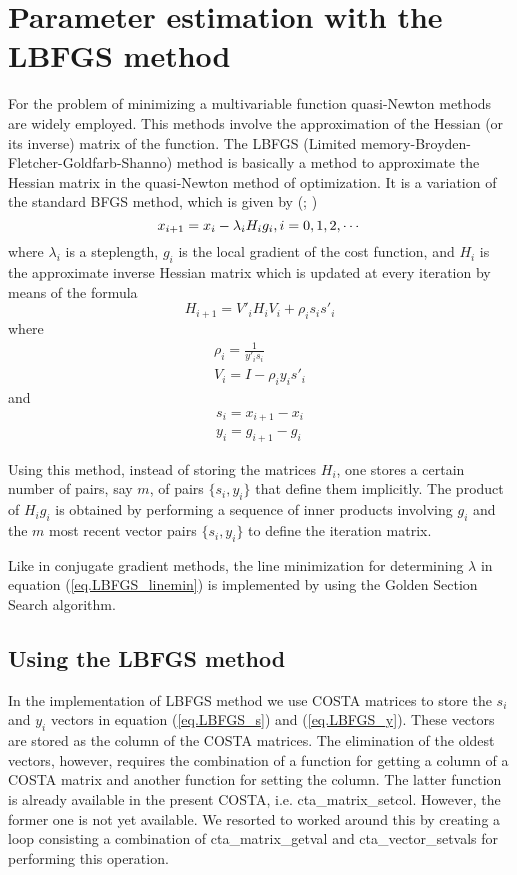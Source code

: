 \section{Parameter estimation with the LBFGS method}
For the problem of minimizing a multivariable function quasi-Newton methods
are widely employed. This methods involve the approximation of the Hessian
(or its inverse) matrix of the function. The LBFGS (Limited
memory-Broyden-Fletcher-Goldfarb-Shanno) method is basically a method to
approximate the Hessian matrix in the quasi-Newton method of optimization.
It is a variation of the standard BFGS method, which is given by (\cite{Nocedal1980}; \cite{Byrdetall1994})
\begin{equation}
  \label{eq.LBFGS_linemin}
    x_{i+1}=x_i-\lambda_iH_ig_i, \space \space i=0,1,2,\cdots
\end{equation}
where $\lambda_i$ is a steplength, $g_i$ is the local gradient of the cost
function, and $H_i$ is the approximate inverse Hessian matrix which is
updated at every iteration by means of the formula
\begin{equation}
    H_{i+1}=V'_i H_i V_i + \rho_i s_i s'_i
\end{equation}
where
\begin{eqnarray}
    \rho_i=\frac{1}{y'_i s_i} \\
    V_i=I-\rho_i y_i s'_i
\end{eqnarray}
and
\begin{eqnarray}
    s_i=x_{i+1}-x_i \label{eq.LBFGS_s} \\
    y_i=g_{i+1}-g_i \label{eq.LBFGS_y}
\end{eqnarray}

Using this method, instead of storing the matrices $H_i$, one stores a
certain number of pairs, say $m$, of pairs $\{s_i,y_i\}$ that define them
implicitly. The product of $H_i g_i$ is obtained by performing a sequence
of inner products involving $g_i$ and the $m$ most recent vector pairs
$\{s_i,y_i\}$ to define the iteration matrix.

Like in conjugate gradient methods, the line minimization for determining
$\lambda$ in equation (\ref{eq.LBFGS_linemin}) is implemented by using the
Golden Section Search algorithm.

\subsection{Using the LBFGS method}
In the implementation of LBFGS method we use COSTA matrices to store the
$s_i$ and $y_i$ vectors in equation (\ref{eq.LBFGS_s}) and
(\ref{eq.LBFGS_y}). These vectors are stored as the column of the COSTA
matrices. The elimination of the oldest vectors, however, requires the
combination of a function for getting a column of a COSTA matrix and
another function for setting the column. The latter function is already
available in the present COSTA, i.e. cta\_matrix\_setcol. However, the
former one is not yet available. We resorted to worked around this by
creating a loop consisting a combination of cta\_matrix\_getval and
cta\_vector\_setvals for performing this operation. 

